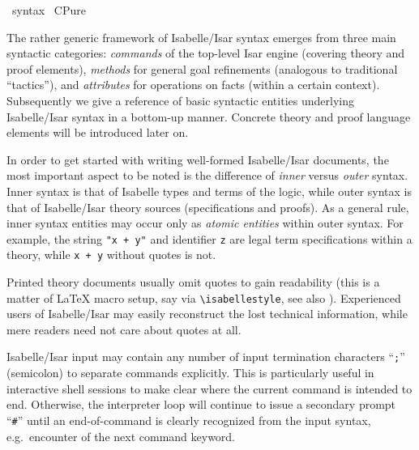 %
\begin{isabellebody}%
\def\isabellecontext{syntax}%
%
\isadelimtheory
\isanewline
\isanewline
%
\endisadelimtheory
%
\isatagtheory
{}\isamarkupfalse%
\ {\isachardoublequoteopen}syntax{\isachardoublequoteclose}\isanewline
{}\ CPure\isanewline
{}%
\endisatagtheory
{\isafoldtheory}%
%
\isadelimtheory
%
\endisadelimtheory
%
\isamarkuptrue%
%
\begin{isamarkuptext}%
The rather generic framework of Isabelle/Isar syntax emerges from
  three main syntactic categories: \emph{commands} of the top-level
  Isar engine (covering theory and proof elements), \emph{methods} for
  general goal refinements (analogous to traditional ``tactics''), and
  \emph{attributes} for operations on facts (within a certain
  context).  Subsequently we give a reference of basic syntactic
  entities underlying Isabelle/Isar syntax in a bottom-up manner.
  Concrete theory and proof language elements will be introduced later
  on.

  \medskip In order to get started with writing well-formed
  Isabelle/Isar documents, the most important aspect to be noted is
  the difference of \emph{inner} versus \emph{outer} syntax.  Inner
  syntax is that of Isabelle types and terms of the logic, while outer
  syntax is that of Isabelle/Isar theory sources (specifications and
  proofs).  As a general rule, inner syntax entities may occur only as
  \emph{atomic entities} within outer syntax.  For example, the string
  \verb|"x + y"| and identifier \verb|z| are legal term
  specifications within a theory, while \verb|x + y| without
  quotes is not.

  Printed theory documents usually omit quotes to gain readability
  (this is a matter of {\LaTeX} macro setup, say via \verb|\isabellestyle|, see also \cite{isabelle-sys}).  Experienced
  users of Isabelle/Isar may easily reconstruct the lost technical
  information, while mere readers need not care about quotes at all.

  \medskip Isabelle/Isar input may contain any number of input
  termination characters ``\verb|;|'' (semicolon) to separate
  commands explicitly.  This is particularly useful in interactive
  shell sessions to make clear where the current command is intended
  to end.  Otherwise, the interpreter loop will continue to issue a
  secondary prompt ``\verb|#|'' until an end-of-command is
  clearly recognized from the input syntax, e.g.\ encounter of the
  next command keyword.


\end{isamarkuptext}
\end{isabellebody}
